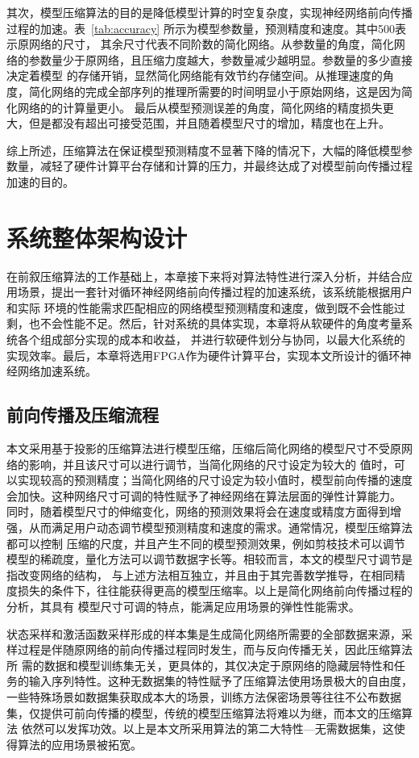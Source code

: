 其次，模型压缩算法的目的是降低模型计算的时空复杂度，实现神经网络前向传播过程的加速。表~\ref{tab:accuracy} 所示为模型参数量，预测精度和速度。其中500表示原网络的尺寸，
其余尺寸代表不同阶数的简化网络。从参数量的角度，简化网络的参数量少于原网络，且压缩力度越大，参数量减少越明显。参数量的多少直接决定着模型
的存储开销，显然简化网络能有效节约存储空间。从推理速度的角度，简化网络的完成全部序列的推理所需要的时间明显小于原始网络，这是因为简化网络的的计算量更小。
最后从模型预测误差的角度，简化网络的精度损失更大，但是都没有超出可接受范围，并且随着模型尺寸的增加，精度也在上升。

综上所述，压缩算法在保证模型预测精度不显著下降的情况下，大幅的降低模型参数量，减轻了硬件计算平台存储和计算的压力，并最终达成了对模型前向传播过程加速的目的。

\section{系统整体架构设计}
在前叙压缩算法的工作基础上，本章接下来将对算法特性进行深入分析，并结合应用场景，提出一套针对循环神经网络前向传播过程的加速系统，该系统能根据用户和实际
环境的性能需求匹配相应的网络模型预测精度和速度，做到既不会性能过剩，也不会性能不足。然后，针对系统的具体实现，本章将从软硬件的角度考量系统各个组成部分实现的成本和收益，
并进行软硬件划分与协同，以最大化系统的实现效率。最后，本章将选用FPGA作为硬件计算平台，实现本文所设计的循环神经网络加速系统。
\subsection{前向传播及压缩流程}
本文采用基于投影的压缩算法进行模型压缩，压缩后简化网络的模型尺寸不受原网络的影响，并且该尺寸可以进行调节，当简化网络的尺寸设定为较大的
值时，可以实现较高的预测精度；当简化网络的尺寸设定为较小值时，模型前向传播的速度会加快。这种网络尺寸可调的特性赋予了神经网络在算法层面的弹性计算能力。
同时，随着模型尺寸的伸缩变化，网络的预测效果将会在速度或精度方面得到增强，从而满足用户动态调节模型预测精度和速度的需求。通常情况，模型压缩算法都可以控制
压缩的尺度，并且产生不同的模型预测效果，例如剪枝技术可以调节模型的稀疏度，量化方法可以调节数据字长等。相较而言，本文的模型尺寸调节是指改变网络的结构，
与上述方法相互独立，并且由于其完善数学推导，在相同精度损失的条件下，往往能获得更高的模型压缩率。以上是简化网络前向传播过程的分析，其具有
模型尺寸可调的特点，能满足应用场景的弹性性能需求。

状态采样和激活函数采样形成的样本集是生成简化网络所需要的全部数据来源，采样过程是伴随原网络的前向传播过程同时发生，而与反向传播无关，因此压缩算法所
需的数据和模型训练集无关，更具体的，其仅决定于原网络的隐藏层特性和任务的输入序列特性。这种无数据集的特性赋予了压缩算法使用场景极大的自由度，
一些特殊场景如数据集获取成本大的场景，训练方法保密场景等往往不公布数据集，仅提供可前向传播的模型，传统的模型压缩算法将难以为继，而本文的压缩算法
依然可以发挥功效。以上是本文所采用算法的第二大特性---无需数据集，这使得算法的应用场景被拓宽。

